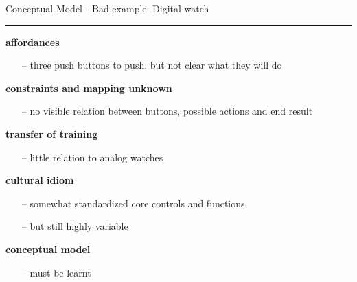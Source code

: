\documentclass[pdf]{beamer}
\begin{document}
  
  
  \begin{frame}
      {Conceptual Model - Bad example: Digital watch}{\textcolor{red}{\rule{12cm}{1.2pt}}}

\textbf{affordances}
       \begin{itemize}
      \item [--]\small{three push buttons to push, but not clear what they will do}
    \end{itemize}
    \bigskip
   
\textbf{constraints and mapping unknown }
           \begin{itemize}
      \item [--]\small{no visible relation between buttons, possible actions and end result}
    \end{itemize}
    
	 \bigskip
     
\textbf{transfer of training}
           \begin{itemize}
      \item [--]\small{little relation to analog watches}
    \end{itemize}
    
     \bigskip

\textbf{cultural idiom}
           \begin{itemize}
      \item [--]\small{somewhat standardized core controls and functions}
 \item [--]\small{but still highly variable }
    \end{itemize}
    
     \bigskip

\textbf{conceptual model}
           \begin{itemize}
      \item [--]\small{must be learnt}
    \end{itemize}
    

\end{frame}
\end{document}
